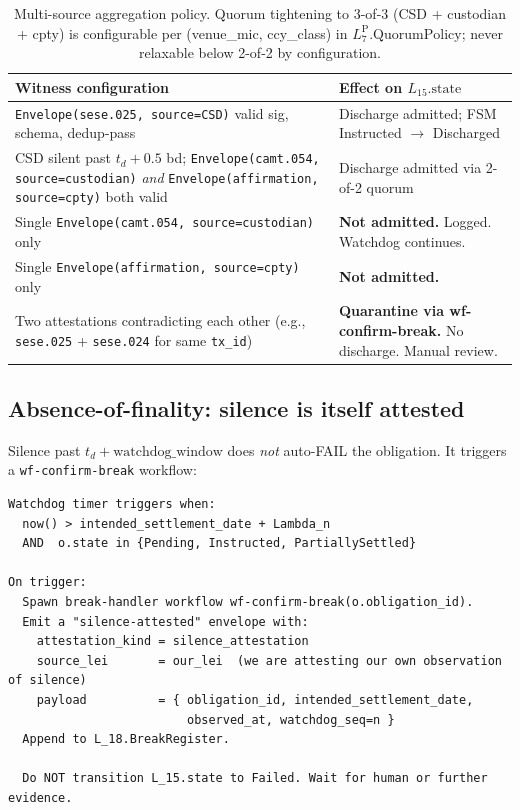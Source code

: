 \documentclass[11pt,a4paper]{article}
\begin{document}
\begin{table}[h]
\centering
\begin{small}
\begin{tabular}{p{6.5cm}p{6.5cm}}
\toprule
\textbf{Witness configuration} & \textbf{Effect on $L_{15}.\mathrm{state}$} \\
\midrule
\texttt{Envelope(sese.025, source=CSD)} valid sig, schema, dedup-pass & Discharge admitted; FSM Instructed $\to$ Discharged \\
CSD silent past $t_d + 0.5$ bd; \texttt{Envelope(camt.054, source=custodian)} \emph{and} \texttt{Envelope(affirmation, source=cpty)} both valid & Discharge admitted via 2-of-2 quorum \\
Single \texttt{Envelope(camt.054, source=custodian)} only & \textbf{Not admitted.} Logged. Watchdog continues. \\
Single \texttt{Envelope(affirmation, source=cpty)} only & \textbf{Not admitted.} \\
Two attestations contradicting each other (e.g., \texttt{sese.025} + \texttt{sese.024} for same \texttt{tx\_id}) & \textbf{Quarantine via wf-confirm-break.} No discharge. Manual review. \\
\bottomrule
\end{tabular}
\end{small}
\caption{Multi-source aggregation policy. Quorum tightening to 3-of-3 (CSD + custodian + cpty) is configurable per (venue\_mic, ccy\_class) in $L_7^{\mathrm{P}}.\mathrm{QuorumPolicy}$; never relaxable below 2-of-2 by configuration.}
\end{table}

\subsection{Absence-of-finality: silence is itself attested}
\label{sec:absence-of-finality}

Silence past $t_d + \mathrm{watchdog\_window}$ does \emph{not} auto-FAIL the obligation. It triggers a \texttt{wf-confirm-break} workflow:

\begin{lstlisting}
Watchdog timer triggers when:
  now() > intended_settlement_date + Lambda_n
  AND  o.state in {Pending, Instructed, PartiallySettled}

On trigger:
  Spawn break-handler workflow wf-confirm-break(o.obligation_id).
  Emit a "silence-attested" envelope with:
    attestation_kind = silence_attestation
    source_lei       = our_lei  (we are attesting our own observation of silence)
    payload          = { obligation_id, intended_settlement_date,
                         observed_at, watchdog_seq=n }
  Append to L_18.BreakRegister.

  Do NOT transition L_15.state to Failed. Wait for human or further evidence.
\end{lstlisting}
\end{document}
